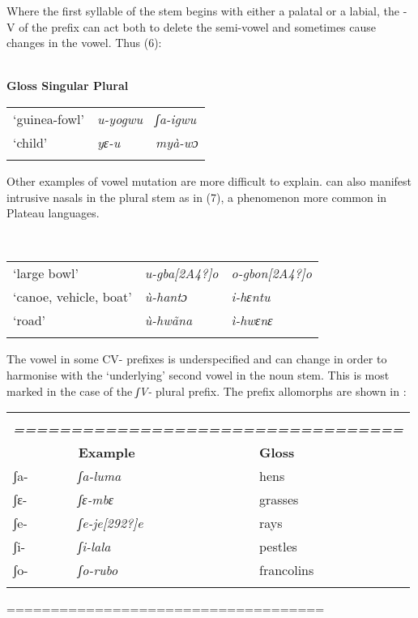 \documentclass[output=paper]{langsci/langscibook}
\begin{document}
Where the first syllable of the stem begins with either a palatal or a labial, the -V of the prefix can act both to delete the semi-vowel and sometimes cause changes in the vowel. Thus (6):

\ea\label{ex:key:}
 \\
\gll     \textbf{{Gloss    Singular  Plural}}\\
\begin{tabularx}{\textwidth}{XXX}
\lsptoprule
‘guinea-fowl’ &  \textit{u-yogwu} &  \textit{ʃa-igwu}\\
‘child’ &  \textit{yɛ-u} &  \textit{myà-wɔ}\\
\lspbottomrule
\end{tabularx}
Other examples of vowel mutation are more difficult to explain.  can also manifest intrusive nasals in the plural stem as in (7), a phenomenon more common in Plateau languages. 

\ea\label{ex:key:}
 \\
\begin{tabularx}{\textwidth}{XXX}
\lsptoprule
‘large bowl’ &  \textit{u-gba[2A4?]o} &  \textit{o-gbon[2A4?]o}\\
‘canoe, vehicle, boat’ &  \textit{ù-hantɔ} &  \textit{i-hɛntu}\\
‘road’ &  \textit{ù-hwãna} &  \textit{ì-hwɛnɛ}\\
\lspbottomrule
\end{tabularx}
The vowel in some CV- prefixes is underspecified and can change in order to harmonise with the ‘underlying’ second vowel in the noun stem. This is most marked in the case of the \textit{ʃV-} plural prefix. The prefix allomorphs are shown in : 

\begin{tabularx}{\textwidth}{XXX}
\lsptoprule
\multicolumn{3}{c}{\itshape \textbf{{\tabref{tab:key:25}:}}\textbf{ {Prefix and stem harmony in Basa}}}\\
\multicolumn{3}{c}{\itshape \textbf{{==================================}}}\\
& \textbf{Example} & \textbf{Gloss}\\
ʃa- & \textit{ʃa-luma} & hens\\
ʃɛ{}- & \textit{ʃɛ{}-mbɛ} & grasses\\
ʃe- & \textit{ʃe-je[292?]e} & rays\\
ʃi- & \textit{ʃi-lala} & pestles\\
ʃo- & \textit{ʃo-rubo} & francolins\\
\lspbottomrule
\end{tabularx}
        ====================================
\end{document}
